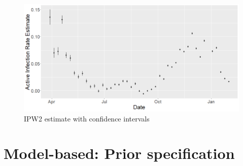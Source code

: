 \documentclass[11pt]{amsart}
\numberwithin{equation}{section}
\theoremstyle{plain}
\begin{document}
\begin{figure}[!th]
 \centering
 \includegraphics[width=.6\linewidth]{../figs/tv_air_cis.png}
 \caption{IPW2 estimate with confidence intervals}
 \label{fig:air_cis}
\end{figure}



\section{Model-based: Prior specification}
\label{app:prior_modelbased}
\end{document}
